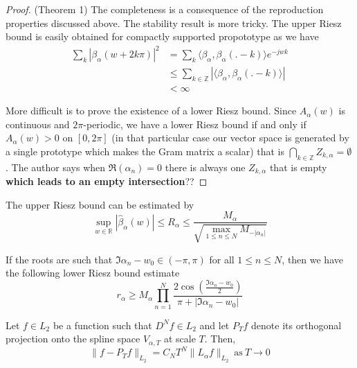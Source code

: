 \documentclass[a4paper, 11pt]{article}
\begin{document}
\begin{proof} (Theorem 1)
  The completeness is a consequence of the reproduction properties discussed above. The stability result is more tricky.  
  The upper Riesz bound is easily obtained for compactly supported propototype as we have
  \begin{align*}
    \sum_k |\beta_{\alpha}(w+2k\pi)|^2 &= \sum_k \langle \beta_{\alpha}, \beta_{\alpha}(.-k) \rangle e^{-jwk} \\
    & \leq \sum_{k \in \mathbb{Z}}  |\langle \beta_{\alpha}, \beta_{\alpha}(.-k) \rangle| \\
    & < \infty
  \end{align*}

  More difficult is to prove the existence of a lower Riesz bound. Since $A_{\alpha}(w)$ is continuous and 
  $2\pi$-periodic, we have a lower Riesz bound if and only if $A_{\alpha}(w) > 0$ on $[0,2\pi]$ (in that particular case 
  our vector space is generated by a single prototype which makes the Gram matrix a scalar) that is $\bigcap_{k \in 
  \mathbb{Z}} Z_{k, \alpha} = \emptyset$. The author says when $\Re(\alpha_n)=0$ there is always one  $Z_{k, \alpha}$ 
  that is empty \textbf{which leads to an empty intersection}??
\end{proof}

\begin{prop}{3}
  The upper Riesz bound can be estimated by 
  \begin{equation*}
    \sup_{w \in \mathbb{R}} |\hat{\beta}_{\alpha}(w)| \leq R_{\alpha} \leq \frac{M_{\alpha}}{\sqrt{\max_{1\leq n \leq N} 
    M_{-|\alpha_n|}}}
  \end{equation*}
\end{prop}

\begin{prop}{4}
  If the roots are such that $\Im{\alpha_n} - w_0 \in (-\pi, \pi)$ for all $1\leq n \leq N$, then we have the following 
  lower Riesz bound estimate
  \begin{equation*}
    r_{\alpha} \geq M_{\alpha} \prod_{n=1}^N \frac{2\cos(\frac{\Im{\alpha_n}-w_0}{2})}{\pi + |\Im{\alpha_n}-w_0|}
  \end{equation*}
\end{prop}

\begin{thm}{2}
  Let $f \in L_2$ be a function such that $D^N f \in L_2$ and let $P_T f$ denote its orthogonal projection onto the 
  spline space $V_{\alpha, T}$ at scale $T$. Then,
  \begin{equation*}
    \|f - P_T f\|_{L_2} = C_N T^N \|L_{\alpha}f \|_{L_2} \ \text{as} \ T \to 0
  \end{equation*}
\end{thm}
\end{document}
